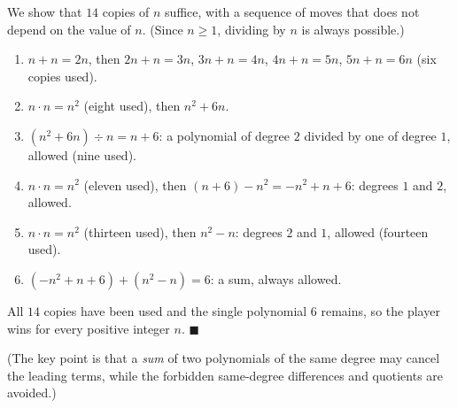 We show that $14$ copies of $n$ suffice, with a sequence of moves that does not depend on the value of $n$. (Since $n\ge1$, dividing by $n$ is always possible.)
\begin{enumerate}
\item $n+n=2n$, then $2n+n=3n$, $3n+n=4n$, $4n+n=5n$, $5n+n=6n$ (six copies used).
\item $n\cdot n=n^2$ (eight used), then $n^2+6n$.
\item $\left(n^2+6n\right)\div n=n+6$: a polynomial of degree $2$ divided by one of degree $1$, allowed (nine used).
\item $n\cdot n=n^2$ (eleven used), then $(n+6)-n^2=-n^2+n+6$: degrees $1$ and $2$, allowed.
\item $n\cdot n=n^2$ (thirteen used), then $n^2-n$: degrees $2$ and $1$, allowed (fourteen used).
\item $\left(-n^2+n+6\right)+\left(n^2-n\right)=6$: a sum, always allowed.
\end{enumerate}
All $14$ copies have been used and the single polynomial $6$ remains, so the player wins for every positive integer $n$. $\blacksquare$

(The key point is that a \emph{sum} of two polynomials of the same degree may cancel the leading terms, while the forbidden same-degree differences and quotients are avoided.)
